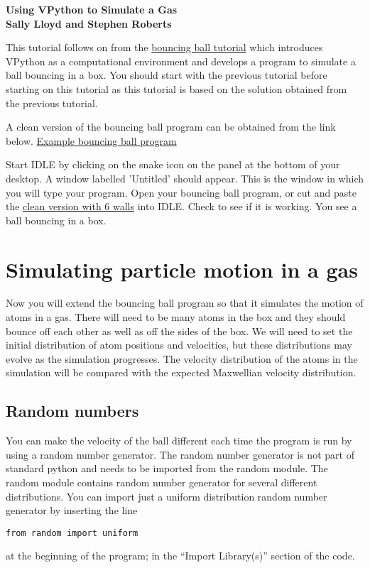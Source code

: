 \documentclass[12pt]{article}
\begin{document}
\begin{center}
 \textbf{\large Using VPython to Simulate a Gas}\\
\textbf{Sally Lloyd and Stephen Roberts}
\end{center}

This tutorial follows on from the \href{tute-bounce.html}{bouncing
ball tutorial} which introduces VPython as a computational
environment and develops a program to simulate a ball bouncing in a
box. You should start with the previous tutorial before starting on
this tutorial as this tutorial is based on the solution obtained
from the  previous tutorial.

A clean version of the bouncing ball program can be obtained from the link below.
\href{bounce2.html}{Example bouncing ball program}

Start IDLE by clicking on the snake icon on the panel at the bottom of your desktop.
A window labelled 'Untitled' should appear.
This is the window in which you will type your program.
Open your bouncing ball program, or cut and paste the \href{bounce2.html}{clean version with 6 walls}
into IDLE. Check to see if it is working. You see a ball bouncing in a box.


\section{Simulating particle motion in a gas}
Now you will extend the bouncing ball program so that it simulates the motion
of atoms in a gas.
There will need to be many atoms in the box and they should bounce off each
other as well as off the sides of the box.
We will need to set the initial distribution of atom positions and velocities,
but these distributions may evolve as the simulation progresses.
The velocity distribution of the atoms in the simulation will be compared with the expected
Maxwellian velocity distribution.

\subsection{Random numbers}
You can make the velocity of the ball different each time the program is
run by using a random number generator.
The random number generator is not part of standard python and needs to be
imported from the random module.
The random module contains random number generator for several different distributions.
You can import just a uniform distribution random number generator by inserting the line
{\color{code}\begin{verbatim}
from random import uniform
\end{verbatim}}
at
the beginning of the program; in the ``Import Library(s)'' section of the code.
\end{document}
